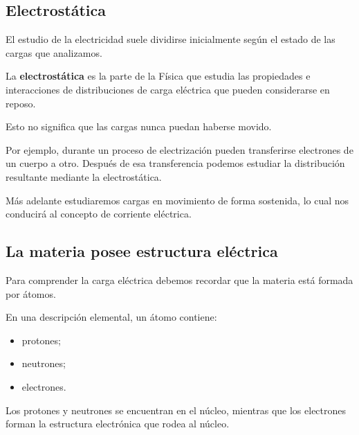 
\subsection{Electrostática}

El estudio de la electricidad suele dividirse inicialmente según el estado
de las cargas que analizamos.

\begin{definicion}[Electrostática]
La \textbf{electrostática} es la parte de la Física que estudia las
propiedades e interacciones de distribuciones de carga eléctrica que pueden
considerarse en reposo.
\end{definicion}

Esto no significa que las cargas nunca puedan haberse movido.

Por ejemplo, durante un proceso de electrización pueden transferirse
electrones de un cuerpo a otro. Después de esa transferencia podemos estudiar
la distribución resultante mediante la electrostática.

Más adelante estudiaremos cargas en movimiento de forma sostenida, lo cual
nos conducirá al concepto de corriente eléctrica.



\subsection{La materia posee estructura eléctrica}

Para comprender la carga eléctrica debemos recordar que la materia está
formada por átomos.

En una descripción elemental, un átomo contiene:

\begin{itemize}
    \item protones;
    \item neutrones;
    \item electrones.
\end{itemize}

Los protones y neutrones se encuentran en el núcleo, mientras que los
electrones forman la estructura electrónica que rodea al núcleo.

